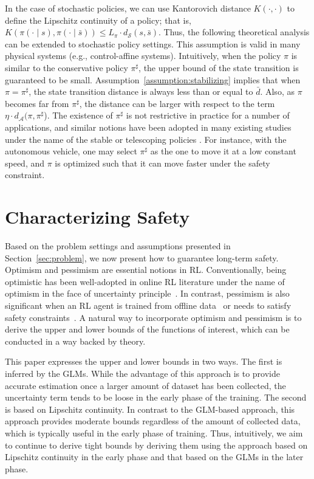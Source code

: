 \documentclass[letterpaper]{article} %
\newcommand{\cA}{\mathcal{A}}
\newcommand{\cS}{\mathcal{S}}
\begin{document}
\noindent
In the case of stochastic policies, we can use Kantorovich distance $K(\cdot, \cdot)$ to define the Lipschitz continuity of a policy; that is, $K(\pi(\cdot \mid s), \pi(\cdot \mid \bar{s})) \le L_\pi \cdot d_\cS(s, \bar{s})$.
Thus, the following theoretical analysis can be extended to stochastic policy settings.
This assumption is valid in many physical systems (e.g., control-affine systems).
Intuitively, when the policy $\pi$ is similar to the conservative policy $\pi^\sharp$, the upper bound of the state transition is guaranteed to be small.
Assumption~\ref{assumption:stabilizing} implies that when $\pi = \pi^\sharp$, the state transition distance is always less than or equal to $\bar{d}$.
Also, as $\pi$ becomes far from $\pi^\sharp$, the distance can be larger with respect to the term $\eta \cdot d_\cA (\pi, \pi^\sharp$).
The existence of $\pi^\sharp$ is not restrictive in practice for a number of applications, and similar notions have been adopted in many existing studies under the name of the stable or telescoping policies \cite{lin2021perturbation,tsukamoto2021contraction}.
For instance, with the autonomous vehicle, one may select
$\pi^\sharp$ as the one to move it at a low constant speed,
and $\pi$ is optimized such that it can move faster under the safety constraint.


\section{Characterizing Safety}
\label{sec:preliminary}

Based on the problem settings and assumptions presented in Section~\ref{sec:problem}, we now present how to guarantee long-term safety.
Optimism and pessimism are essential notions in RL.
Conventionally, being optimistic has been well-adopted in online RL literature under the name of optimism in the face of uncertainty principle~\cite{strehl2008analysis,auer2007logarithmic}.
In contrast, pessimism is also significant when an RL agent is trained from offline data~\cite{jin2021pessimism,buckman2020importance} or needs to satisfy safety constraints~\cite{bura2022dope}.
%
A natural way to incorporate optimism and pessimism is to derive the upper and lower bounds of the functions of interest, which can be conducted in a way backed by theory.

This paper expresses the upper and lower bounds in two ways.
The first is inferred by the GLMs.
While the advantage of this approach is to provide accurate estimation once a larger amount of dataset has been collected, the uncertainty term tends to be loose in the early phase of the training.
The second is based on Lipschitz continuity.
In contrast to the GLM-based approach, this approach provides moderate bounds regardless of the amount of collected data, which is typically useful in the early phase of training.
Thus, intuitively, we aim to continue to derive tight bounds by deriving them using the approach based on Lipschitz continuity in the early phase and that based on the GLMs in the later phase.
\end{document}
